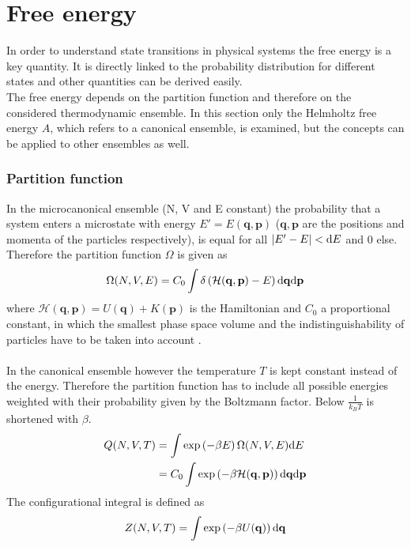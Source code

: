 \section{Free energy}
In order to understand state transitions in physical systems the free energy is a key quantity. It is directly linked to the probability distribution for different states and other quantities can be derived easily.\\
The free energy depends on the partition function and therefore on the considered thermodynamic ensemble. In this section only the Helmholtz free energy $A$, which refers to a canonical ensemble, is examined, but the concepts can be applied to other ensembles as well.
\subsubsection{Partition function}
In the microcanonical ensemble (N, V and E constant) the probability that a system enters a microstate with energy $E' = E(\mathbf{q}, \mathbf{p})$ ($\mathbf{q}, \mathbf{p}$ are the positions and momenta of the particles respectively), is equal for all $\left|E' - E\right| < \text{d} E$ and $0$ else. Therefore the partition function $\Omega$ is given as
\begin{equation}
\label{eq:partfunc}
\Omega(N, V, E) = C_0 \int \delta\left(\mathcal{H}(\mathbf{q}, \mathbf{p}) - E\right) \text{d} \mathbf{q} \text{d} \mathbf{p}
\end{equation}
where $\mathcal{H}(\mathbf{q}, \mathbf{p}) = U(\mathbf{q}) + K(\mathbf{p})$ is the Hamiltonian and $C_0$ a proportional constant, in which the smallest phase space volume and the indistinguishability of particles have to be taken into account \autocite[16]{freeEnergyBook}.\\
\\
In the canonical ensemble however the temperature $T$ is kept constant instead of the energy. Therefore the partition function has to include all possible energies weighted with their probability given by the Boltzmann factor. Below $\frac{1}{k_B T}$ is shortened with $\beta$.
\begin{align}
Q(N, V, T) &= \int \exp\left(-\beta E\right) \Omega(N, V, E) \text{d} E\\
&= C_0 \int \exp\left(-{\beta\mathcal{H}(\mathbf{q}, \mathbf{p})}\right) \text{d} \mathbf{q} \text{d} \mathbf{p}
\end{align}
The configurational integral is defined as 
\begin{equation}
Z(N, V, T) = \int \exp\left(-{\beta U}(\mathbf{q})\right) \text{d} \mathbf{q}
\end{equation}
